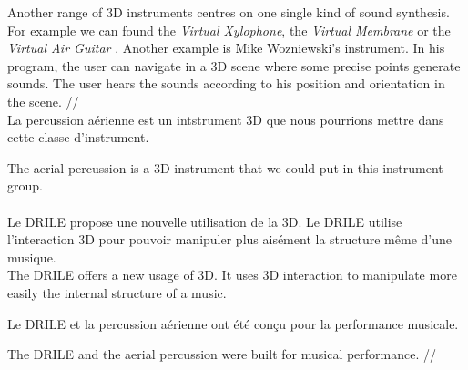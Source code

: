 Another range of 3D instruments centres on one single kind of sound synthesis. For example we can found the \textit{Virtual Xylophone}, the \textit{Virtual Membrane} or the \textit{Virtual Air Guitar} \cite{maki2005}. Another example is Mike Wozniewski's \cite{wozniewski2006spatial} instrument. In his program, the user can navigate in a 3D scene where some precise points generate sounds. The user hears the sounds according to his position and orientation in the scene.
//
\\
La percussion aérienne est un intstrument 3D que nous pourrions mettre dans cette classe d'instrument.

The aerial percussion is a 3D instrument that we could put in this instrument group.

\paragraph{}
Le DRILE propose une nouvelle utilisation de la 3D. Le DRILE utilise l'interaction 3D pour pouvoir manipuler plus aisément la structure même d'une musique.
\\
The DRILE offers a new usage of 3D. It uses 3D interaction to manipulate more easily the internal structure of a music.

Le DRILE et la percussion aérienne ont été conçu pour la performance musicale.

The DRILE and the aerial percussion were built for musical performance.
//
